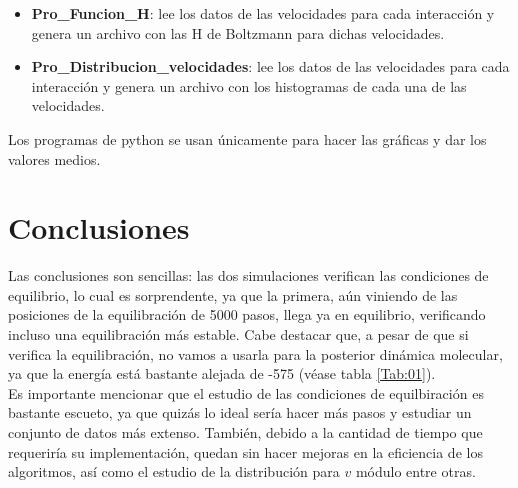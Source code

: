 \documentclass[11pt]{article} %
\begin{document}
\begin{itemize}
	\item \textbf{Pro\_Funcion\_H}: lee los datos de las velocidades para cada interacción y genera un archivo con las H de Boltzmann para dichas velocidades. 
	\item \textbf{Pro\_Distribucion\_velocidades}: lee los datos de las velocidades para cada interacción y genera un archivo con los histogramas de cada una de las velocidades.
\end{itemize}
Los programas de python se usan únicamente para hacer las gráficas y dar los valores medios.
	
\section{Conclusiones}

Las conclusiones son sencillas: las dos simulaciones verifican las condiciones de equilibrio, lo cual es sorprendente, ya que la primera, aún viniendo de las posiciones de la equilibración de 5000 pasos, llega ya en equilibrio, verificando incluso una equilibración más estable. Cabe destacar que, a pesar de que si verifica la equilibración, no vamos a usarla para la posterior dinámica molecular, ya que la energía está bastante alejada de -575 (véase tabla \ref{Tab:01}).  \\

Es importante mencionar que el estudio de las condiciones de equilbiración es bastante escueto, ya que quizás lo ideal sería hacer más pasos y estudiar un conjunto de datos más extenso. También, debido a la cantidad de tiempo que requeriría su implementación, quedan sin hacer mejoras en la eficiencia de los algoritmos, así como el estudio de la distribución para $v$ módulo entre otras. 
	
	


	
	
\end{document}

